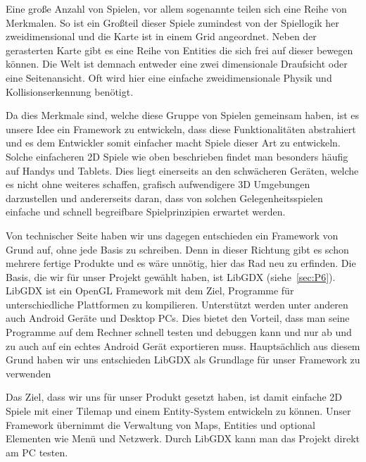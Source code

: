 Eine große Anzahl von Spielen, vor allem sogenannte  teilen sich eine Reihe von Merkmalen.
So ist ein Großteil dieser Spiele zumindest von der Spiellogik her zweidimensional und die Karte ist in einem Grid angeordnet. Neben der gerasterten Karte gibt es eine Reihe von Entities die sich frei auf dieser bewegen können. Die Welt ist demnach entweder eine zwei dimensionale Draufsicht oder eine Seitenansicht. Oft wird hier eine einfache zweidimensionale Physik und Kollisionserkennung benötigt.

Da dies Merkmale sind, welche diese Gruppe von Spielen gemeinsam haben, ist es unsere Idee ein Framework zu entwickeln, dass diese Funktionalitäten abstrahiert und es dem Entwickler somit einfacher macht Spiele dieser Art zu entwickeln.
Solche einfacheren 2D Spiele wie oben beschrieben findet man besonders häufig auf Handys und Tablets. Dies liegt einerseits an den schwächeren Geräten, welche es nicht ohne weiteres schaffen, grafisch aufwendigere 3D Umgebungen darzustellen und andererseits daran, dass von solchen Gelegenheitsspielen einfache und schnell begreifbare Spielprinzipien erwartet werden.

Von technischer Seite haben wir uns dagegen entschieden ein Framework von Grund auf, ohne jede Basis zu schreiben. Denn in dieser Richtung gibt es schon mehrere fertige Produkte und es wäre unnötig, hier das Rad neu zu erfinden. 
Die Basis, die wir für unser Projekt gewählt haben, ist LibGDX (siehe~\ref{sec:P6}). LibGDX ist ein OpenGL Framework mit dem Ziel, Programme für unterschiedliche Plattformen zu kompilieren. Unterstützt werden unter anderen auch Android Geräte und Desktop PCs. Dies bietet den Vorteil, dass man seine Programme auf dem Rechner schnell testen und debuggen kann und nur ab und zu auch auf ein echtes Android Gerät exportieren muss. Hauptsächlich aus diesem Grund haben wir uns entschieden LibGDX als Grundlage für unser Framework zu verwenden

Das Ziel, dass wir uns für unser Produkt gesetzt haben, ist damit einfache 2D Spiele mit einer Tilemap und einem Entity-System entwickeln zu können. Unser Framework übernimmt die Verwaltung von Maps, Entities und optional Elementen wie Menü und Netzwerk. Durch LibGDX kann man das Projekt direkt am PC testen.
